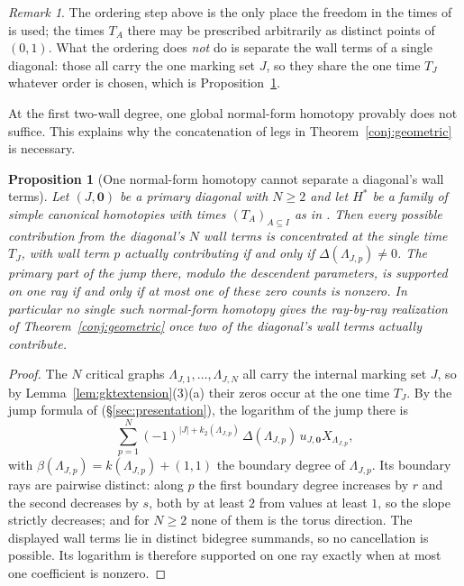 \documentclass[11pt]{amsart}
\newtheorem{proposition}[theorem]{Proposition}
\theoremstyle{definition}
\theoremstyle{remark}
\newtheorem{remark}[theorem]{Remark}
\begin{document}
\begin{remark}
\label{rem:orderinggap}
The ordering step above is the only place the freedom in the times of
\cite[Lem.~3.40]{GKT} is used; the times $T_A$ there may be prescribed
arbitrarily as distinct points of $(0,1)$. What the ordering does
\emph{not} do is separate the wall terms of a single diagonal: those all carry the one
marking set $J$, so they share the one time $T_{J}$ whatever order is chosen, which
is Proposition~\ref{prop:obstruction}.
\end{remark}

At the first two-wall degree, one global normal-form homotopy provably
does not suffice. This explains why the concatenation of legs in
Theorem~\ref{conj:geometric} is necessary.

\begin{proposition}[One normal-form homotopy cannot separate a diagonal's wall terms]
\label{prop:obstruction}
Let $(J,\mathbf 0)$ be a primary diagonal with $N\ge2$ and let $H^{*}$ be a family
of simple canonical homotopies with times $(T_{A})_{A\subseteq I}$ as in
\cite[Lem.~3.40]{GKT}. Then every possible contribution from the diagonal's
$N$ wall terms is concentrated at the single time $T_{J}$, with wall term $p$
actually contributing if and only if $\Delta(\Lambda_{J,p})\ne0$. The primary part of
the jump there, modulo the descendent parameters, is supported on one ray if
and only if at most one of these zero counts is nonzero.
In particular no single
such normal-form homotopy gives the ray-by-ray realization of
Theorem~\ref{conj:geometric} once two of the diagonal's wall terms actually
contribute.
\end{proposition}

\begin{proof}
The $N$ critical graphs $\Lambda_{J,1},\dots,\Lambda_{J,N}$ all carry the internal
marking set $J$, so by Lemma~\ref{lem:gktextension}(3)(a) their zeros occur at the one
time $T_{J}$. By the jump formula of \cite[proof of Thm.~5.9]{GKT}
(\S\ref{sec:presentation}), the logarithm of the jump there is
\[
\sum_{p=1}^{N}(-1)^{|J|+k_{2}(\Lambda_{J,p})}\,\Delta(\Lambda_{J,p})\,
u_{J,\mathbf0}X_{\Lambda_{J,p}},
\]
with $\beta(\Lambda_{J,p})=k(\Lambda_{J,p})+(1,1)$ the boundary degree of
$\Lambda_{J,p}$.  Its boundary rays are pairwise distinct: along $p$ the first
boundary degree increases by $r$ and the second decreases by $s$, both by at least
$2$ from values at least $1$, so the slope strictly decreases; and for $N\ge2$ none
of them is the torus direction. The displayed wall terms lie in distinct
bidegree summands, so no cancellation is possible. Its logarithm is therefore
supported on one ray exactly when at most one coefficient is nonzero.
\end{proof}
\end{document}
